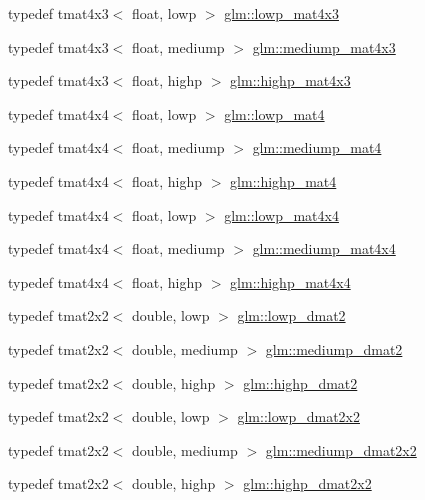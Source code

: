 \begin{DoxyCompactItemize}
\item 
typedef tmat4x3$<$ float, lowp $>$ \hyperlink{group__core__precision_ga4649624907ac00347237476ead4178e1}{glm\-::lowp\-\_\-mat4x3}
\item 
typedef tmat4x3$<$ float, mediump $>$ \hyperlink{group__core__precision_ga98bbda89d371b41b3d56bcbc7a4d868d}{glm\-::mediump\-\_\-mat4x3}
\item 
typedef tmat4x3$<$ float, highp $>$ \hyperlink{group__core__precision_ga549b3b126dfbf5f9fef6b76deb15cb4e}{glm\-::highp\-\_\-mat4x3}
\item 
typedef tmat4x4$<$ float, lowp $>$ \hyperlink{group__core__precision_ga070380d2efa0c37d16f8677412518e02}{glm\-::lowp\-\_\-mat4}
\item 
typedef tmat4x4$<$ float, mediump $>$ \hyperlink{group__core__precision_ga2bd55bee1eaded7673421b1ae24175d5}{glm\-::mediump\-\_\-mat4}
\item 
typedef tmat4x4$<$ float, highp $>$ \hyperlink{group__core__precision_ga26f802a535816c7357df06361e695172}{glm\-::highp\-\_\-mat4}
\item 
typedef tmat4x4$<$ float, lowp $>$ \hyperlink{group__core__precision_ga83e14edb4422871bdc644f4209b5f9ff}{glm\-::lowp\-\_\-mat4x4}
\item 
typedef tmat4x4$<$ float, mediump $>$ \hyperlink{group__core__precision_gaad45864262bb2cf923667fde779a0058}{glm\-::mediump\-\_\-mat4x4}
\item 
typedef tmat4x4$<$ float, highp $>$ \hyperlink{group__core__precision_gaccec2a0346f946bcbd656386a9ab87d7}{glm\-::highp\-\_\-mat4x4}
\item 
typedef tmat2x2$<$ double, lowp $>$ \hyperlink{group__core__precision_ga42a83e53bbcc740b6ae501fec19dda69}{glm\-::lowp\-\_\-dmat2}
\item 
typedef tmat2x2$<$ double, mediump $>$ \hyperlink{group__core__precision_ga15d28c9d2c24b698597e9ad9e083520d}{glm\-::mediump\-\_\-dmat2}
\item 
typedef tmat2x2$<$ double, highp $>$ \hyperlink{group__core__precision_ga08cc902dad76205cd28a80bf695814a7}{glm\-::highp\-\_\-dmat2}
\item 
typedef tmat2x2$<$ double, lowp $>$ \hyperlink{group__core__precision_ga62d3af99b9e0659d693c80b75df9a35c}{glm\-::lowp\-\_\-dmat2x2}
\item 
typedef tmat2x2$<$ double, mediump $>$ \hyperlink{group__core__precision_ga949bee59342f1c3258522bacd07ffe95}{glm\-::mediump\-\_\-dmat2x2}
\item 
typedef tmat2x2$<$ double, highp $>$ \hyperlink{group__core__precision_gaf0445ee32625d26bf79bb84e3d5a5502}{glm\-::highp\-\_\-dmat2x2}

\end{DoxyCompactItemize}
